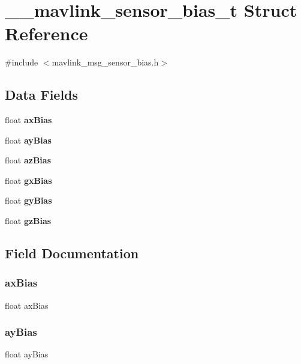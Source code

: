 \section{\+\_\+\+\_\+mavlink\+\_\+sensor\+\_\+bias\+\_\+t Struct Reference}
\label{struct____mavlink__sensor__bias__t}


{\ttfamily \#include $<$mavlink\+\_\+msg\+\_\+sensor\+\_\+bias.\+h$>$}

\subsection*{Data Fields}
\begin{DoxyCompactItemize}
\item 
float \textbf{ ax\+Bias}
\item 
float \textbf{ ay\+Bias}
\item 
float \textbf{ az\+Bias}
\item 
float \textbf{ gx\+Bias}
\item 
float \textbf{ gy\+Bias}
\item 
float \textbf{ gz\+Bias}
\end{DoxyCompactItemize}


\subsection{Field Documentation}
\mbox{\label{struct____mavlink__sensor__bias__t_ae1ba425a7481097804f35e2d35dcb46b}} 
\subsubsection{ax\+Bias}
{\footnotesize\ttfamily float ax\+Bias}

\mbox{\label{struct____mavlink__sensor__bias__t_a29b65c901550f49bb962e7f880311464}} 
\subsubsection{ay\+Bias}
{\footnotesize\ttfamily float ay\+Bias}

